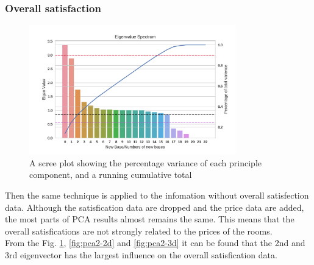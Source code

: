 \documentclass[12pt]{article}
\begin{document}
\subsubsection{Overall satisfaction}
\begin{figure}[htb]
\centering
\includegraphics[width = 0.8\textwidth]{images/eigenvalues2.png}
\caption{ A scree plot showing the percentage variance of each principle component, and a running cumulative total}
\label{fig:eigenvalues1}
\end{figure}
Then the same technique is applied to the infomation without overall satisfection data. 
Although the satisfication data are dropped and the price data are added, the most parts of PCA results almost remains the same. This means that the overall satisfications are not strongly related to the prices of the rooms.\\
From the Fig. \ref{fig:eigenvalues1}, \ref{fig:pca2-2d} and \ref{fig:pca2-3d} it can be found that the 2nd and 3rd eigenvector has the largest influence on the overall satisfication data. \\
\end{document}
